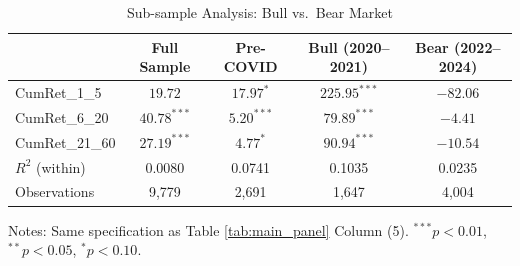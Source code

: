 \begin{table}[htbp]\centering
\caption{Sub-sample Analysis: Bull vs.\ Bear Market}
\label{tab:subsample}
\begin{tabular}{lcccc}
\toprule
 & Full Sample & Pre-COVID & Bull (2020--2021) & Bear (2022--2024) \\
\midrule
CumRet\_1\_5 & $19.72$ & $17.97^{*}$ & $225.95^{***}$ & $-82.06$ \\
CumRet\_6\_20 & $40.78^{***}$ & $5.20^{***}$ & $79.89^{***}$ & $-4.41$ \\
CumRet\_21\_60 & $27.19^{***}$ & $4.77^{*}$ & $90.94^{***}$ & $-10.54$ \\
\midrule
$R^2$ (within) & 0.0080 & 0.0741 & 0.1035 & 0.0235 \\
Observations & 9,779 & 2,691 & 1,647 & 4,004 \\
\bottomrule
\end{tabular}
\begin{tablenotes}\small
\item Notes: Same specification as Table \ref{tab:main_panel} Column (5).
$^{***}p<0.01$, $^{**}p<0.05$, $^{*}p<0.10$.
\end{tablenotes}
\end{table}